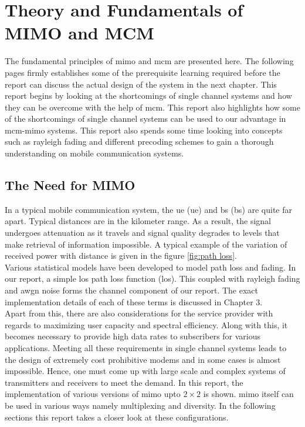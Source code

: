 \chapter{Theory and Fundamentals of MIMO and MCM}
The fundamental principles of \acrshort{mimo} and \acrshort{mcm} are presented here. The following pages firmly establishes some of the prerequisite learning required before the report can discuss the actual design of the system in the next chapter. This report begins by looking at the shortcomings of single channel systems and how they can be overcome with the help of \acrshort{mcm}. This report also highlights how some of the shortcomings of single channel systems can be used to our advantage in \acrshort{mcm}-\acrshort{mimo} systems. This report also spends some time looking into concepts such as \gls{rayleigh fading} and different precoding schemes to gain a thorough understanding on mobile communication systems.

\section{The Need for MIMO}

In a typical mobile communication system, the \acrlong{ue} (\acrshort{ue}) and \acrlong{bs} (\acrshort{bs}) are quite far apart. Typical distances are in the kilometer range. As a result, the signal undergoes attenuation as it travels and signal quality degrades to levels that make retrieval of information impossible. A typical example of the variation of received power with distance is given in the figure \ref{fig:path loss}.\\
Various statistical models have been developed to model path loss and fading. In our report, a simple \acrlong{los} path loss function (\acrshort{los}). This coupled with \gls{rayleigh fading} and \acrshort{awgn} noise forms the channel component of our report. The exact implementation details of each of these terms is discussed in Chapter 3.\\

Apart from this, there are also considerations for the service provider with regards to maximizing user capacity and spectral efficiency. Along with this, it becomes necessary to provide high data rates to subscribers for various applications. Meeting all these requirements in single channel systems leads to the design of extremely cost prohibitive modems and in some cases is almost impossible. Hence, one must come up with large scale and complex systems of transmitters and receivers to meet the demand. In this report, the implementation of various versions of \acrshort{mimo} upto $2 \times 2$ is shown. \acrshort{mimo} itself can be used in various ways namely multiplexing and diversity. In the following sections this report takes a closer look at these configurations.

